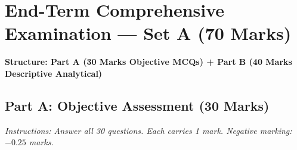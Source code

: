 \section{End-Term Comprehensive Examination --- Set A (70 Marks)}
\label{sec:endterm_set_a}


\begin{center}
\sffamily\textbf{\color{AlertRed}Structure: Part A (30 Marks Objective MCQs) + Part B (40 Marks Descriptive Analytical)}
\end{center}

\subsection*{Part A: Objective Assessment (30 Marks)}
\textit{Instructions: Answer all 30 questions. Each carries 1 mark. Negative marking: $-0.25$ marks.}

